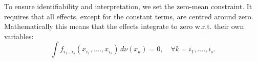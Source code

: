 To ensure identifiability and interpretation, we set the zero-mean constraint. It requires that all effects, except for the constant terms, are centred around zero.
Mathematically this means that the effects integrate to zero w.r.t. their own variables:
\begin{equation}
    \int f_{i_{1}...i_{s}} (x_{i_{1}}, ...., x_{i_{s}}) \, d\nu (x_k) = 0, \quad \forall k = i_1, ...., i_s.
    \label{eq:zero_mean_condition}
\end{equation}


